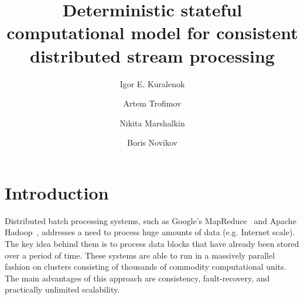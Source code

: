 \documentclass[sigconf]{acmart}
\theoremstyle{remark}
\begin{document}
\title {Deterministic stateful computational model for consistent distributed stream processing}


\author{Igor E. Kuralenok}

\author{Artem Trofimov}

\author{Nikita Marshalkin}

\author{Boris Novikov}




\begin{abstract}
\end {abstract}

\maketitle

\section {Introduction}
Distributed batch processing systems, such as Google's MapReduce~\cite{Dean:2008:MSD:1327452.1327492} and Apache Hadoop~\cite{hadoop2009hadoop}, addresses a need to process huge amounts of data (e.g. Internet scale). The key idea behind them is to process data blocks that have already been stored over a period of time. These systems are able to run in a massively parallel fashion on clusters consisting of thousands of commodity computational units. The main advantages of this approach are consistency, fault-recovery, and practically unlimited scalability.
\end{document}

